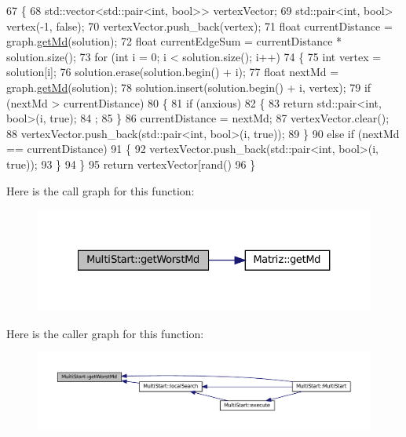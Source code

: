 \begin{DoxyCode}
67 \{
68   std::vector<std::pair<int, bool>> vertexVector;
69   std::pair<int, bool> vertex(-1, \textcolor{keyword}{false});
70   vertexVector.push\_back(vertex);
71   \textcolor{keywordtype}{float} currentDistance = graph.\hyperlink{classMatriz_a8df14a27d791f24206dd633b2a685c5b}{getMd}(solution);
72   \textcolor{keywordtype}{float} currentEdgeSum = currentDistance * solution.size();
73   \textcolor{keywordflow}{for} (\textcolor{keywordtype}{int} i = 0; i < solution.size(); i++)
74   \{
75     \textcolor{keywordtype}{int} vertex = solution[i];
76     solution.erase(solution.begin() + i);
77     \textcolor{keywordtype}{float} nextMd = graph.\hyperlink{classMatriz_a8df14a27d791f24206dd633b2a685c5b}{getMd}(solution);
78     solution.insert(solution.begin() + i, vertex);
79     \textcolor{keywordflow}{if} (nextMd > currentDistance)
80     \{
81       \textcolor{keywordflow}{if} (anxious)
82       \{
83         \textcolor{keywordflow}{return} std::pair<int, bool>(i, \textcolor{keyword}{true});
84         ;
85       \}
86       currentDistance = nextMd;
87       vertexVector.clear();
88       vertexVector.push\_back(std::pair<int, bool>(i, \textcolor{keyword}{true}));
89     \}
90     \textcolor{keywordflow}{else} \textcolor{keywordflow}{if} (nextMd == currentDistance)
91     \{
92       vertexVector.push\_back(std::pair<int, bool>(i, \textcolor{keyword}{true}));
93     \}
94   \}
95   \textcolor{keywordflow}{return} vertexVector[rand() %
96 \}
\end{DoxyCode}
Here is the call graph for this function\+:\nopagebreak
\begin{figure}[H]
\begin{center}
\leavevmode
\includegraphics[width=327pt]{classMultiStart_a0ad5ed40a5c4ab964cb27f79343eed98_cgraph}
\end{center}
\end{figure}
Here is the caller graph for this function\+:\nopagebreak
\begin{figure}[H]
\begin{center}
\leavevmode
\includegraphics[width=350pt]{classMultiStart_a0ad5ed40a5c4ab964cb27f79343eed98_icgraph}
\end{center}
\end{figure}
\mbox{\label{classMultiStart_af27ae5dbba5f924070f103b7bf5987a3}} 
